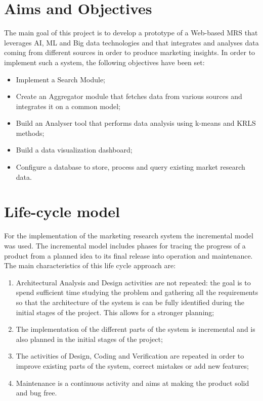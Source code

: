 \section{Aims and Objectives}
The main goal of this project is to develop a prototype of a Web-based \ac{MRS} that leverages AI, ML and Big data technologies and that integrates and analyses data coming from different sources in order to produce marketing insights. In order to implement such a system, the following objectives have been set:
\begin{itemize}
	\item Implement a Search Module;
	\item Create an Aggregator module that fetches data from various sources and integrates it on a common model;
	\item Build an Analyser tool that performs data analysis using k-means and \ac{KRLS} methods;
	\item Build a data visualization dashboard;
	\item Configure a database to store, process and query existing market research data.
\end{itemize}

\newpage
\section{Life-cycle model}
For the implementation of the marketing research system the incremental model was used. The incremental model includes phases for tracing the progress of a product from a planned idea to its final release into operation and maintenance. The main characteristics of this life cycle approach are:

\begin{enumerate}  
	\item Architectural Analysis and Design activities are not repeated: the goal is to spend sufficient time studying the problem and gathering all the requirements so that the architecture of the system is can be fully identified during the initial stages of the project. This allows for a stronger planning;
	\item The implementation of the different parts of the system is incremental and is also planned in the initial stages of the project;
	\item The activities of Design, Coding and Verification are repeated in order to improve existing parts of the system, correct mistakes or add new features;
	\item Maintenance is a continuous activity and aims at making the product solid and bug free.
\end{enumerate}


